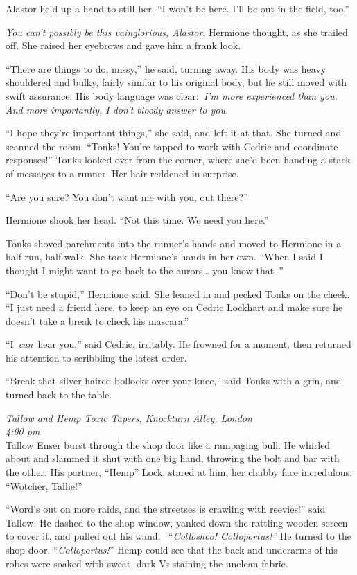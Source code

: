 Alastor held up a hand to still her. ``I won't be here. I'll be out in
the field, too.''

\emph{You can't possibly be this vainglorious, Alastor}, Hermione
thought, as she trailed off. She raised her eyebrows and gave him a
frank look.

``There are things to do, missy,'' he said, turning away. His body was
heavy shouldered and bulky, fairly similar to his original body, but he
still moved with swift assurance. His body language was clear:~\emph{I'm
more experienced than you. And more importantly, I don't bloody answer
to you.}

``I hope they're important things,'' she said, and left it at that. She
turned and scanned the room. ``Tonks! You're tapped to work with Cedric
and coordinate responses!'' Tonks looked over from the corner, where
she'd been handing a stack of messages to a runner. Her hair reddened in
surprise.

``Are you sure? You don't want me with you, out there?''

Hermione shook her head. ``Not this time. We need you here.''

Tonks shoved parchments into the runner's hands and moved to Hermione in
a half-run, half-walk. She took Hermione's hands in her own. ``When I
said I thought I might want to go back to the aurors\ldots{} you know
that--''

``Don't be stupid,'' Hermione said. She leaned in and pecked Tonks on
the cheek. ``I just need a friend here, to keep an eye on Cedric
Lockhart and make sure he doesn't take a break to check his mascara.''

``I~\emph{can}~hear you,'' said Cedric, irritably. He frowned for a
moment, then returned his attention to scribbling the latest order.

``Break that silver-haired bollocks over your knee,'' said Tonks with a
grin, and turned back to the table.

\mybreak

\emph{Tallow and Hemp Toxic Tapers, Knockturn Alley, London}\\
\emph{4:00 pm}\\

Tallow Enser burst through the shop door like a rampaging bull. He
whirled about and slammed it shut with one big hand, throwing the bolt
and bar with the other. His partner, ``Hemp'' Lock, stared at him, her
chubby face incredulous. ``Wotcher, Tallie!''

``Word's out on more raids, and the streetses is crawling with
reevies!'' said Tallow. He dashed to the shop-window, yanked down the
rattling wooden screen to cover it, and pulled out his wand.
~``\emph{Colloshoo! Colloportus!''} He turned to the shop door.
``\emph{Colloportus!}'' Hemp could see that the back and underarms of
his robes were soaked with sweat, dark Vs staining the unclean fabric.

